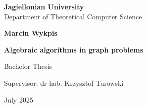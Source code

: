 \begin{titlepage}
\begin{center}

\large
\textbf{Jagiellonian University}\\
Department of Theoretical Computer Science\\

\vspace{1.5cm}

\Large
\textbf{Marcin Wykpis}

\vspace*{2cm}

\textbf{\LARGE Algebraic algorithms in graph problems}

\vspace{0.5cm}
\large

\vfill
\Large
Bachelor Thesis

\vfill
\Large
Supervisor: dr hab. Krzysztof Turowski

\vspace{0.8cm}

July 2025
		
\end{center}
\end{titlepage}